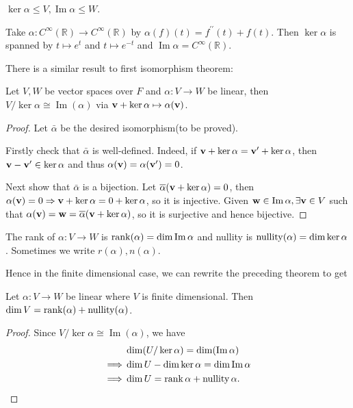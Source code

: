 \documentclass[a4paper,11pt]{article}
\begin{document}
\begin{lemma}
    $\ker\alpha\le V,\operatorname{Im}\alpha\le W$.
\end{lemma}
\begin{example}
    Take $\alpha:C^\infty(\mathbb R)\to C^\infty(\mathbb R)$ by $\alpha(f)(t)=f^{\prime\prime}(t)+f(t)$.
    Then $\ker\alpha$ is spanned by $t\mapsto e^t$ and $t\mapsto e^{-t}$ and $\operatorname{Im}\alpha=C^{\infty}(\mathbb R)$.
\end{example}
There is a similar result to first isomorphism theorem:
\begin{theorem}
    Let $V,W$ be vector spaces over $F$ and $\alpha:V\to W$ be linear, then $V/{\ker\alpha}\cong \operatorname{Im}(\alpha)$ via ${\bf v}+\ker\alpha\mapsto \alpha({\bf v})$.
\end{theorem}
\begin{proof}
    Let $ \bar{\alpha} $ be the desired isomorphism(to be proved).

    Firstly check that $ \bar{\alpha} $ is well-defined. Indeed, if $ {\bf v}+\ker \alpha={\bf v}'+\ker \alpha $, then $ {\bf v}-{\bf v}'\in \ker \alpha $ and thus $ \alpha({\bf v})=\alpha({\bf v}')=0 $.

    Next show that $ \bar{\alpha} $ is a bijection. Let $ \overline{\alpha}({\bf v}+\ker \alpha)=0 $, then $ \alpha({\bf v})=0 \Rightarrow {\bf v}+\ker \alpha=0+\ker \alpha $, so it is injective. Given $ {\bf w}\in \Im \alpha, \exists {\bf v}\in V $ such that $ \alpha({\bf v})={\bf w} =\overline{\alpha}({\bf v}+\ker \alpha)$, so it is surjective and hence bijective.
\end{proof}
\begin{definition}
    The rank of $\alpha:V\to W$ is $\rank(\alpha)=\dim\operatorname{Im}\alpha$ and nullity is $\operatorname{nullity}(\alpha)=\dim\ker\alpha$. Sometimes we write $ r(\alpha),n(\alpha) $. 
\end{definition}
Hence in the finite dimensional case, we can rewrite the preceding theorem to get
\begin{theorem}
    Let $\alpha:V\to W$ be linear where $V$ is finite dimensional.
    Then $\dim V=\rank(\alpha)+\operatorname{nullity}(\alpha)$.
\end{theorem}
\begin{proof}
    Since $ V/{\ker\alpha}\cong \operatorname{Im}(\alpha) $, we have 
    \begin{align*}
        & \dim (U/\ker \alpha)=\dim (\Im \alpha)\\ 
        \implies & \dim U-\dim \ker \alpha=\dim \Im \alpha\\ 
        \implies & \dim U = \rank \alpha+ \operatorname{nullity} \alpha.\qedhere
    \end{align*}
\end{proof}
\end{document}
